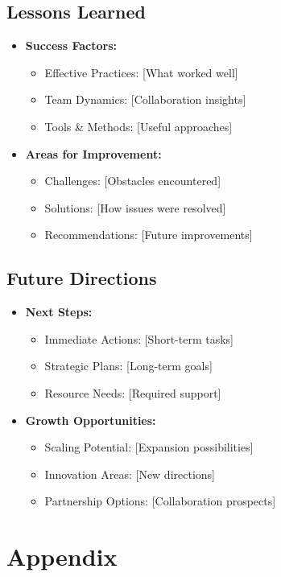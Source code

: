 \documentclass{article}
\begin{document}
\subsection{Lessons Learned}
\begin{itemize}
    \item \textbf{Success Factors:}
    \begin{itemize}
        \item Effective Practices: [What worked well]
        \item Team Dynamics: [Collaboration insights]
        \item Tools \& Methods: [Useful approaches]
    \end{itemize}

    \item \textbf{Areas for Improvement:}
    \begin{itemize}
        \item Challenges: [Obstacles encountered]
        \item Solutions: [How issues were resolved]
        \item Recommendations: [Future improvements]
    \end{itemize}
\end{itemize}
\subsection{Future Directions}
\begin{itemize}
    \item \textbf{Next Steps:}
    \begin{itemize}
        \item Immediate Actions: [Short-term tasks]
        \item Strategic Plans: [Long-term goals]
        \item Resource Needs: [Required support]
    \end{itemize}
    \item \textbf{Growth Opportunities:}
    \begin{itemize}
        \item Scaling Potential: [Expansion possibilities]
        \item Innovation Areas: [New directions]
        \item Partnership Options: [Collaboration prospects]
    \end{itemize}
\end{itemize}
\section{Appendix}
\end{document}
